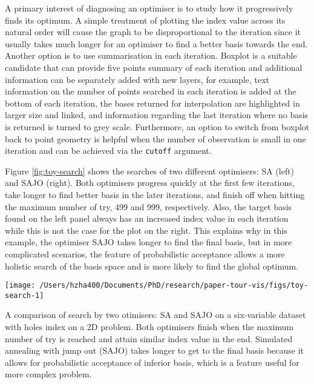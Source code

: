 A primary interest of diagnosing an optimiser is to study how it
progressively finds its optimum. A simple treatment of plotting the
index value across its natural order will cause the graph to be
disproportional to the iteration since it usually takes much longer for
an optimiser to find a better basis towards the end. Another option is
to use summarisation in each iteration. Boxplot is a suitable candidate
that can provide five points summary of each iteration and additional
information can be separately added with new layers, for example, text
information on the number of points searched in each iteration is added
at the bottom of each iteration, the bases returned for interpolation
are highlighted in larger size and linked, and information regarding the
last iteration where no basis is returned is turned to grey scale.
Furthermore, an option to switch from boxplot back to point geometry is
helpful when the number of observation is small in one iteration and can
be achieved via the \texttt{cutoff} argument.

Figure \ref{fig:toy-search} shows the searches of two different
optimisers: SA (left) and SAJO (right). Both optimisers progress quickly
at the first few iterations, take longer to find better basis in the
later iterations, and finish off when hitting the maximum number of try,
499 and 999, respectively. Also, the target basis found on the left
panel always has an increased index value in each iteration while this
is not the case for the plot on the right. This explains why in this
example, the optimiser SAJO takes longer to find the final basis, but in
more complicated scenarios, the feature of probabilistic acceptance
allows a more holistic search of the basis space and is more likely to
find the global optimum.

\begin{Schunk}
\begin{widefigure}

{\centering \texttt{[image: /Users/hzha400/Documents/PhD/research/paper-tour-vis/figs/toy-search-1]} 

}

\caption[A comparison of search by two otimisers]{A comparison of search by two otimisers: SA and SAJO on a six-variable dataset  with holes index on a 2D problem. Both optimisers finish when the maximum number of try is reached and attain similar index value in the end. Simulated annealing with jump out (SAJO) takes longer to get to the final basis because it allows for probabilistic acceptance of inferior basis, which is a feature useful for more complex problem.}\label{fig:toy-search}
\end{widefigure}
\end{Schunk}

